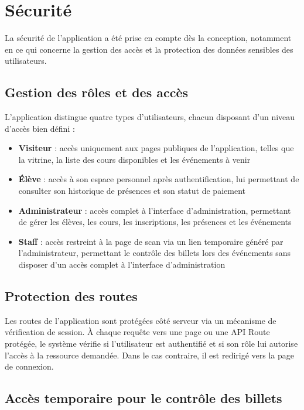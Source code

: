 \documentclass{article}
\begin{document}
\section{Sécurité}

La sécurité de l'application a été prise en compte dès la conception, 
notamment en ce qui concerne la gestion des accès et la protection des 
données sensibles des utilisateurs.

\subsection{Gestion des rôles et des accès}

L'application distingue quatre types d'utilisateurs, chacun disposant 
d'un niveau d'accès bien défini :

\begin{itemize}
    \item \textbf{Visiteur} : accès uniquement aux pages publiques 
    de l'application, telles que la vitrine, la liste des cours 
    disponibles et les événements à venir
    \item \textbf{Élève} : accès à son espace personnel après 
    authentification, lui permettant de consulter son historique 
    de présences et son statut de paiement
    \item \textbf{Administrateur} : accès complet à l'interface 
    d'administration, permettant de gérer les élèves, les cours, 
    les inscriptions, les présences et les événements
    \item \textbf{Staff} : accès restreint à la page de scan 
    via un lien temporaire généré par l'administrateur, permettant 
    le contrôle des billets lors des événements sans disposer 
    d'un accès complet à l'interface d'administration
\end{itemize}

\subsection{Protection des routes}

Les routes de l'application sont protégées côté serveur via un 
mécanisme de vérification de session. À chaque requête vers une 
page ou une API Route protégée, le système vérifie si l'utilisateur 
est authentifié et si son rôle lui autorise l'accès à la ressource 
demandée. Dans le cas contraire, il est redirigé vers la page de 
connexion.

\subsection{Accès temporaire pour le contrôle des billets}
\end{document}
